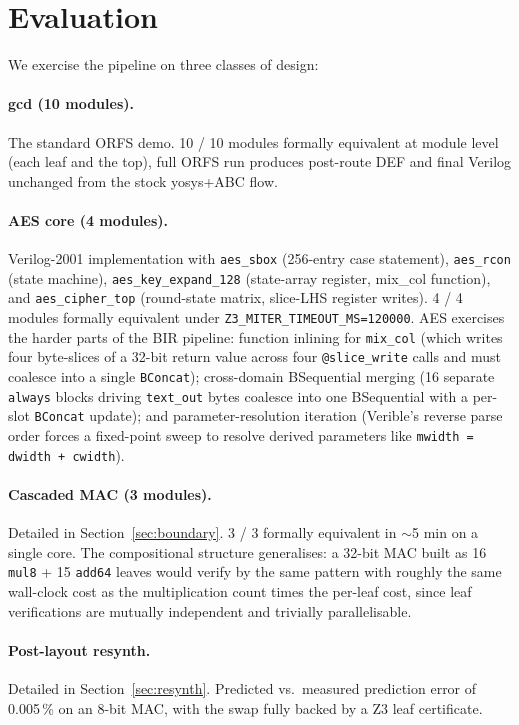 \documentclass[11pt,a4paper]{article}
\begin{document}
\section{Evaluation}
\label{sec:eval}

We exercise the pipeline on three classes of design:

\paragraph{gcd (10 modules).} The standard ORFS demo.  10 / 10
modules formally equivalent at module level (each leaf and the
top), full ORFS run produces post-route DEF and final Verilog
unchanged from the stock yosys+ABC flow.

\paragraph{AES core (4 modules).} Verilog-2001 implementation with
\texttt{aes\_sbox} (256-entry case statement), \texttt{aes\_rcon}
(state machine), \texttt{aes\_key\_expand\_128} (state-array
register, mix\_col function), and \texttt{aes\_cipher\_top}
(round-state matrix, slice-LHS register writes).  4 / 4 modules
formally equivalent under
\texttt{Z3\_MITER\_TIMEOUT\_MS=120000}.  AES exercises the harder
parts of the BIR pipeline: function inlining for \texttt{mix\_col}
(which writes four byte-slices of a 32-bit return value across
four \texttt{@slice\_write} calls and must coalesce into a single
\texttt{BConcat}); cross-domain BSequential merging (16 separate
\texttt{always} blocks driving \texttt{text\_out} bytes coalesce
into one BSequential with a per-slot \texttt{BConcat} update);
and parameter-resolution iteration (Verible's reverse parse
order forces a fixed-point sweep to resolve derived parameters
like \texttt{mwidth = dwidth + cwidth}).

\paragraph{Cascaded MAC (3 modules).} Detailed in
Section~\ref{sec:boundary}.  3 / 3 formally equivalent in
$\sim$5 min on a single core.  The compositional structure
generalises: a 32-bit MAC built as 16 \texttt{mul8} + 15
\texttt{add64} leaves would verify by the same pattern with
roughly the same wall-clock cost as the multiplication count
times the per-leaf cost, since leaf verifications are mutually
independent and trivially parallelisable.

\paragraph{Post-layout resynth.} Detailed in
Section~\ref{sec:resynth}.  Predicted vs.\ measured prediction
error of 0.005\,\% on an 8-bit MAC, with the swap fully backed by
a Z3 leaf certificate.
\end{document}
